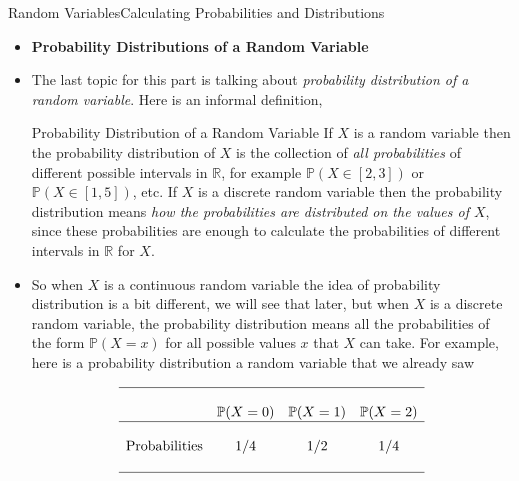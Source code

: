 \documentclass[8pt, usepdftitle = false]{beamer}
\begin{document}
\begin{frame}[allowframebreaks]{Random Variables}{Calculating Probabilities and Distributions}
\begin{itemize}
\framebreak

\item \textbf{Probability Distributions of a Random Variable}

\item The last topic for this part is talking about \emph{probability distribution of a random variable}. Here is an informal definition, 


\begin{varblock}{Probability Distribution of a Random Variable}
	If $X$ is a random variable then the probability distribution of $X$ is the collection of \emph{all probabilities} of different possible intervals in $\mathbb{R}$, for example $\mathbb{P}(X \in [2, 3])$ or $\mathbb{P}(X \in [1, 5])$, etc. If $X$ is a \alert{discrete random variable} then the probability distribution means \emph{how the probabilities are distributed on the values of $X$}, since these probabilities are enough to calculate the probabilities of different intervals in $\mathbb{R}$ for $X$.
\end{varblock}


\item So when $X$ is a continuous random variable the idea of probability distribution is a bit different, we will see that later, but when $X$ is a discrete random variable, the probability distribution means all the probabilities of the form $\mathbb{P}(X = x)$ for all possible values $x$ that $X$ can take. For example, here is a probability distribution a random variable that we already saw



\begin{align*}
\begin{array}{cccc}
\hline \\
& \mathbb{P}(X=0)  & \mathbb{P}(X=1) & \mathbb{P}(X=2) \\
\hline \\
 \text{Probabilities} & 1/4 & 1/2 & 1/4 \\
\\
\hline
\end{array}
\end{align*}








\end{itemize}
\end{frame}
\end{document}
